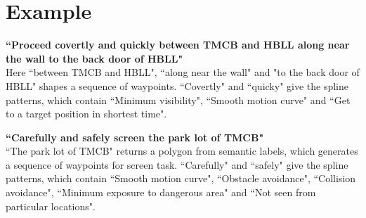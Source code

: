 \documentclass[12pt]{article}
\begin{document}
\section{Example}

\textbf{``Proceed covertly and quickly between TMCB and HBLL along near the wall to the back door of HBLL"} \\
Here ``between TMCB and HBLL", ``along near the wall" and "to the back door of HBLL" shapes a sequence of waypoints. 
``Covertly" and ``quicky" give the spline patterns, which contain ``Minimum visibility", ``Smooth motion curve" and ``Get to a target position in shortest time".

\textbf{``Carefully and safely screen the park lot of TMCB"} \\
``The park lot of TMCB" returns a polygon from semantic labels, which generates a sequence of waypoints for screen task. 
``Carefully" and ``safely" give the spline patterns, which contain ``Smooth motion curve", ``Obstacle avoidance", ``Collision avoidance", ``Minimum exposure to dangerous area" and ``Not seen from particular locations".



\end{document}
